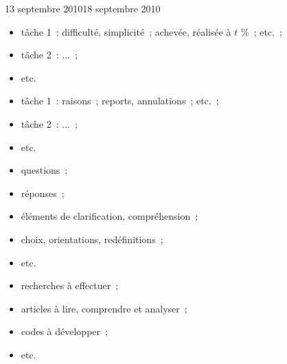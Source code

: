 \documentclass[11pt, french, screen, research-development]{report-rd-info}
\begin{document}
\begin{fichesuivi}{13 septembre 2010}{18 septembre 2010}

   \begin{travaileffectue}
      \begin{itemize}
         \item tâche 1~: difficulté, simplicité~; achevée, réalisée à $t$ \%~; etc.~;
         \item tâche 2~: ...~;
         \item etc.
      \end{itemize}
   \end{travaileffectue}

   \begin{travailnoneffectue}
      \begin{itemize}
         \item tâche 1~: raisons~; reports, annulations~; etc.~;
         \item tâche 2~: ...~;
         \item etc.
      \end{itemize}
   \end{travailnoneffectue}

   \begin{echange}
      \begin{itemize}
         \item questions~;
         \item réponses~;
         \item éléments de clarification, compréhension~;
         \item choix, orientations, redéfinitions~;
         \item etc.
      \end{itemize}
   \end{echange}

   \begin{planification}
      \begin{itemize}
         \item recherches à effectuer~;
         \item articles à lire, comprendre et analyser~;
         \item codes à développer~;
         \item etc.
      \end{itemize}
   \end{planification}
\end{fichesuivi}
\end{document}
